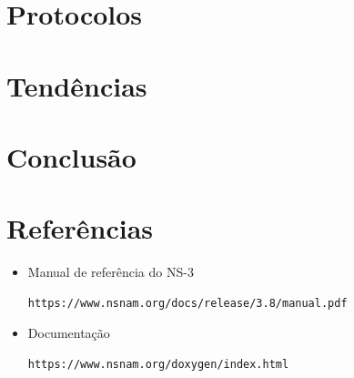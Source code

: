 \documentclass[12pt,a4paper]{report}
\begin{document}
\chapter{Protocolos}

\chapter{Tendências}

\chapter{Conclusão}

\chapter{Referências}

\begin{itemize}
\item Manual de referência do NS-3 \begin{verbatim}https://www.nsnam.org/docs/release/3.8/manual.pdf\end{verbatim}
\item Documentação \begin{verbatim}https://www.nsnam.org/doxygen/index.html\end{verbatim}
\end{itemize}
\end{document}
